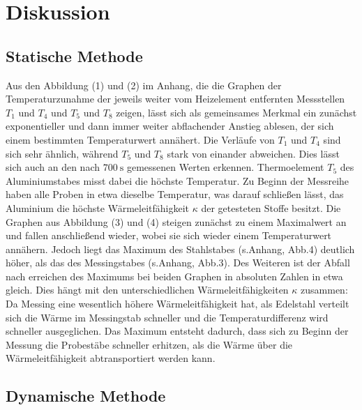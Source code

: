 
\section{Diskussion}
\label{sec:Diskussion}

\subsection{Statische Methode}

Aus den Abbildung (1) und (2) im Anhang, die die Graphen der Temperaturzunahme der jeweils weiter vom Heizelement entfernten Messstellen $T_\text{1}$ und $T_\text{4}$ und $T_\text{5}$ und $T_\text{8}$ zeigen, lässt sich als gemeinsames Merkmal ein zunächst exponentieller und dann immer weiter abflachender Anstieg ablesen, der sich einem bestimmten Temperaturwert annähert.
Die Verläufe von $T_\text{1}$ und $T_\text{4}$ sind sich sehr ähnlich, während $T_\text{5}$ und $T_\text{8}$ stark von einander abweichen.\newline
Dies lässt sich auch an den nach $\SI{700}{\second}$ gemessenen Werten erkennen.
Thermoelement $T_\text{5}$ des Aluminiumstabes misst dabei die höchste Temperatur.
Zu Beginn der Messreihe haben alle Proben in etwa dieselbe Temperatur, was darauf schließen lässt, das Aluminium die höchste Wärmeleitfähigkeit $\kappa$ der getesteten Stoffe besitzt.\newline
Die Graphen aus Abbildung (3) und (4) steigen zunächst zu einem Maximalwert an und fallen anschließend wieder, wobei sie sich wieder einem Temperaturwert annähern.
Jedoch liegt das Maximum des Stahlstabes (s.Anhang, Abb.4)
deutlich höher, als das des Messingstabes (s.Anhang, Abb.3).
Des Weiteren ist der Abfall nach erreichen des Maximums bei beiden Graphen in absoluten Zahlen in etwa gleich.
Dies hängt mit den unterschiedlichen Wärmeleitfähigkeiten $\kappa$ zusammen:
Da Messing eine wesentlich höhere Wärmeleitfähigkeit hat, als Edelstahl verteilt sich die Wärme im Messingstab schneller und die Temperaturdifferenz wird schneller ausgeglichen.
Das Maximum entsteht dadurch, dass sich zu Beginn der Messung die Probestäbe schneller erhitzen, als die Wärme über die Wärmeleitfähigkeit abtransportiert werden kann.

\subsection{Dynamische Methode}

